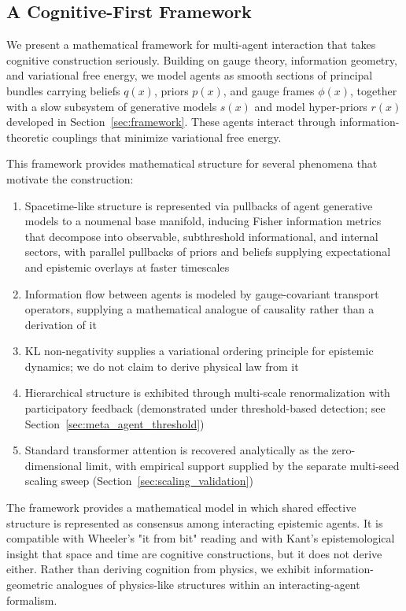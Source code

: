 \documentclass[11pt]{article}
\begin{document}
\subsection{A Cognitive-First Framework}
\label{sec:cognitive_first}

We present a mathematical framework for multi-agent interaction that takes cognitive construction seriously. Building on gauge theory, information geometry, and variational free energy, we model agents as smooth sections of principal bundles carrying beliefs $q(x)$, priors $p(x)$, and gauge frames $\phi(x)$, together with a slow subsystem of generative models $s(x)$ and model hyper-priors $r(x)$ developed in Section~\ref{sec:framework}. These agents interact through information-theoretic couplings that minimize variational free energy.

This framework provides mathematical structure for several phenomena that motivate the construction:
\begin{enumerate}
\item Spacetime-like structure is represented via pullbacks of agent generative models to a noumenal base manifold, inducing Fisher information metrics that decompose into observable, subthreshold informational, and internal sectors, with parallel pullbacks of priors and beliefs supplying expectational and epistemic overlays at faster timescales

\item Information flow between agents is modeled by gauge-covariant transport operators, supplying a mathematical analogue of causality rather than a derivation of it
\item KL non-negativity supplies a variational ordering principle for epistemic dynamics; we do not claim to derive physical law from it
\item Hierarchical structure is exhibited through multi-scale renormalization with participatory feedback (demonstrated under threshold-based detection; see Section~\ref{sec:meta_agent_threshold})
\item Standard transformer attention is recovered analytically as the zero-dimensional limit, with empirical support supplied by the separate multi-seed scaling sweep (Section~\ref{sec:scaling_validation})
\end{enumerate}

The framework provides a mathematical model in which shared effective structure is represented as consensus among interacting epistemic agents. It is compatible with Wheeler's "it from bit" reading and with Kant's epistemological insight that space and time are cognitive constructions, but it does not derive either. Rather than deriving cognition from physics, we exhibit information-geometric analogues of physics-like structures within an interacting-agent formalism.
\end{document}
